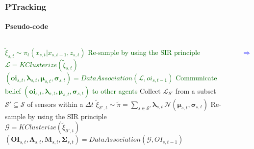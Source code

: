 \begin{frame}
	\frametitle{PTracking}
	\framesubtitle{Pseudo-code}
	
	\begin{columns}[T]
		
		
		{
			\begin{algorithm}[H]
				\tiny
				\BlankLine
				\BlankLine
				\BlankLine
				\Begin
				{
					\textcolor{darkgreen}{$ \tilde{\xi}_{s,t} \sim \pi_t (x_{s,t} | x_{s,t-1},z_{s,t}) $}
					\BlankLine
					\textcolor{darkgreen}{Re-sample by using the SIR principle}\\
					\BlankLine
					\textcolor{darkgreen}{$ \mathcal{L} = KClusterize(\tilde{\xi}_{s,t}) $}
					\BlankLine
					\textcolor{darkgreen}{$ (\boldsymbol{oi}_{s,t},\boldsymbol\lambda_{s,t},\boldsymbol\mu_{s,t},\boldsymbol\sigma_{s,t}) = DataAssociation(\mathcal{L}, oi_{s,t-1}) $}
					\BlankLine
					\textcolor{darkgreen}{Communicate belief $ (\boldsymbol{oi}_{s,t},\boldsymbol\lambda_{s,t},\boldsymbol\mu_{s,t},\boldsymbol\sigma_{s,t}) $ to other agents}
				}
				\BlankLine
				\Begin
				{
					Collect $ \mathcal{L}_{S'} $ from a subset $ \mathcal{S'} \subseteq \mathcal{S} $ of sensors within a $ \Delta t $
					\BlankLine
					$ \tilde{\xi}_{\mathcal{S'},t} \sim \tilde\pi = \sum_{s \in \mathcal{S'}} \boldsymbol\lambda_{s,t} \, \mathcal{N} (\boldsymbol\mu_{s,t},\boldsymbol\sigma_{s,t}) $
					\BlankLine
					Re-sample by using the SIR principle\\
					\BlankLine
					$ \mathcal{G} = KClusterize(\tilde\xi_{{\mathcal{S'},t}}) $
					\BlankLine
					$ (\boldsymbol{OI}_{s,t},\boldsymbol\Lambda_{s,t},\boldsymbol{M}_{s,t},\boldsymbol\Sigma_{s,t}) = DataAssociation(\mathcal{G},OI_{s,t-1}) $
				}
			\end{algorithm}
			
			
			\Huge
			\vspace{2.15cm}
			
			\begin{center}
				\textcolor{blue}{$ \Rightarrow $}
			\end{center}
			
}
\end{columns}
\end{frame}
